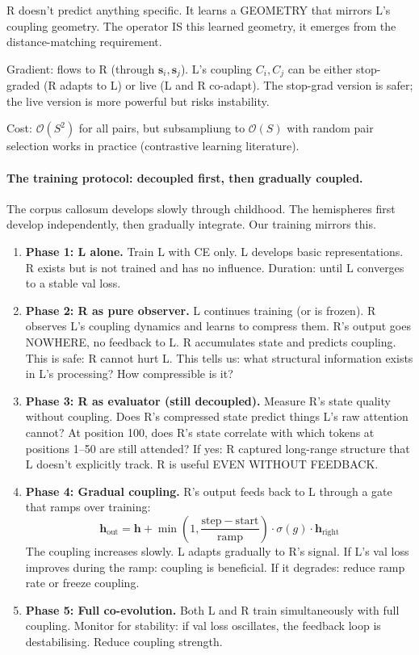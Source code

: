 \documentclass[11pt, a4paper]{article}
\newcommand{\h}{\mathbf{h}}
\theoremstyle{plain}
\theoremstyle{definition}
\theoremstyle{remark}
\begin{document}
R doesn't predict anything specific.
It learns a GEOMETRY that mirrors L's coupling geometry.
The operator IS this learned geometry, it emerges from the distance-matching requirement.

Gradient: flows to R (through $\mathbf{s}_i, \mathbf{s}_j$). L's coupling $C_i, C_j$ can be either stop-graded (R adapts to L) or live (L and R co-adapt). The stop-grad version is safer; the live version is more powerful but risks instability.

Cost: $\mathcal{O}(S^2)$ for all pairs, but subsampliung to $\mathcal{O}(S)$ with random pair selection works in practice (contrastive learning literature).

\paragraph{The training protocol: decoupled first, then gradually coupled.}

The corpus callosum develops slowly through childhood.
The hemispheres first develop independently, then gradually integrate.
Our training mirrors this.

\begin{enumerate}[nosep]
\item \textbf{Phase 1: L alone.} Train L with CE only. L develops basic representations. R exists but is not trained and has no influence. Duration: until L converges to a stable val loss.

\item \textbf{Phase 2: R as pure observer.} L continues training (or is frozen). R observes L's coupling dynamics and learns to compress them. R's output goes NOWHERE, no feedback to L. R accumulates state and predicts coupling. This is safe: R cannot hurt L. This tells us: what structural information exists in L's processing? How compressible is it?

\item \textbf{Phase 3: R as evaluator (still decoupled).} Measure R's state quality without coupling. Does R's compressed state predict things L's raw attention cannot? At position 100, does R's state correlate with which tokens at positions 1--50 are still attended? If yes: R captured long-range structure that L doesn't explicitly track. R is useful EVEN WITHOUT FEEDBACK.

\item \textbf{Phase 4: Gradual coupling.} R's output feeds back to L through a gate that ramps over training:
\begin{equation}
\h_{\mathrm{out}} = \h + \min\!\left(1, \frac{\mathrm{step} - \mathrm{start}}{\mathrm{ramp}}\right) \cdot \sigma(g) \cdot \h_{\mathrm{right}}
\end{equation}
The coupling increases slowly. L adapts gradually to R's signal. If L's val loss improves during the ramp: coupling is beneficial. If it degrades: reduce ramp rate or freeze coupling.

\item \textbf{Phase 5: Full co-evolution.} Both L and R train simultaneously with full coupling. Monitor for stability: if val loss oscillates, the feedback loop is destabilising. Reduce coupling strength.
\end{enumerate}
\end{document}
